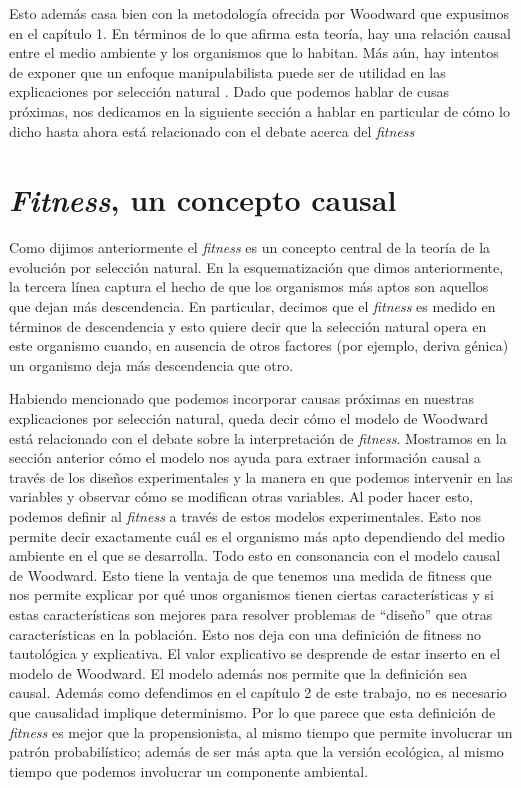 Esto además casa bien con la metodología ofrecida por Woodward que expusimos en el capítulo 1. En términos de lo que afirma esta teoría, hay una relación causal entre el medio ambiente y los organismos que lo habitan. Más aún, hay intentos de exponer que un enfoque manipulabilista puede ser de utilidad en las explicaciones por selección natural \cite{MacColl2011}. Dado que podemos hablar de cusas próximas, nos dedicamos en la siguiente sección a hablar en particular de cómo lo dicho hasta ahora está relacionado con el debate acerca del \emph{fitness}

\section{\emph{Fitness}, un concepto causal}

\noindent Como dijimos anteriormente el \emph{fitness} es un concepto central de la teoría de la evolución por selección natural. En la esquematización que dimos anteriormente, la tercera línea captura el hecho de que los organismos más aptos son aquellos que dejan más descendencia. En particular, decimos que el \emph{fitness} es medido en términos de descendencia y esto quiere decir que la selección natural opera en este organismo cuando, en ausencia de otros factores (por ejemplo, deriva génica) un organismo deja más descendencia que otro.

Habiendo mencionado que podemos incorporar causas próximas en nuestras explicaciones por selección natural, queda decir cómo el modelo de Woodward está relacionado con el debate sobre la interpretación de \emph{fitness}. Mostramos en la sección anterior cómo el modelo nos ayuda para extraer información causal a través de los diseños experimentales y la manera en que podemos intervenir en las variables y observar cómo se modifican otras variables. Al poder hacer esto, podemos definir al \emph{fitness} a través de estos modelos experimentales. Esto nos permite decir exactamente cuál es el organismo más apto dependiendo del medio ambiente en el que se desarrolla. Todo esto en consonancia con el modelo causal de Woodward. Esto tiene la ventaja de que tenemos una medida de fitness que nos permite explicar por qué unos organismos tienen ciertas características y si estas características son mejores para resolver problemas de ``diseño'' que otras características en la población. Esto nos deja con una definición de fitness no tautológica y explicativa. El valor explicativo se desprende de estar inserto en el modelo de Woodward. El modelo además nos permite que la definición sea causal. Además como defendimos en el capítulo 2 de este trabajo, no es necesario que causalidad implique determinismo. Por lo que parece que esta definición de \emph{fitness} es mejor que la propensionista, al mismo tiempo que permite involucrar un patrón probabilístico; además de ser más apta que la versión ecológica, al mismo tiempo que podemos involucrar un componente ambiental.

